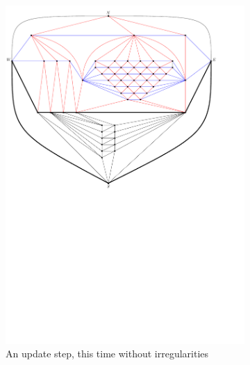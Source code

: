 \begin{figure}
    \ContinuedFloat
    \begin{subfigure}[b]{.9 \textwidth}
      \includegraphics[width=\textwidth]{examples/img/vertWorstCase/sweep5}
      \caption{An update step, this time without irregularities}
      \label{fig:ex:vert:sweep5}
    \end{subfigure}
    ~
    \begin{subfigure}[b]{.9 \textwidth}

\end{subfigure}
\end{figure}
